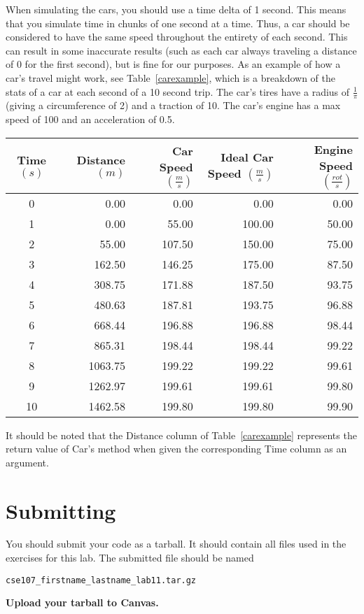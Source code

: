 \documentclass[11pt]{cselabheader}
\begin{document}
\begin{ex}
  When simulating the cars, you should use a time delta of 1 second. This means
  that you simulate time in chunks of one second at a time. Thus, a car should
  be considered to have the same speed throughout the entirety of each second.
  This can result in some inaccurate results (such as each car always
  traveling a distance of 0 for the first second), but is fine for our
  purposes. As an example of how a car's travel might work, see
  Table~\ref{carexample}, which is a breakdown of the stats of a car at each
  second of a 10 second trip. The car's tires have a radius of $\frac{1}{\pi}$
  (giving a circumference of 2) and a traction of 10. The car's engine has a
  max speed of 100 and an acceleration of 0.5.
  
  \begin{center}
    \begin{tabular}{crrrr}
    \toprule
    Time $(s)$ & Distance $(m)$ & Car Speed $(\frac{m}{s})$ &
    Ideal Car Speed $(\frac{m}{s})$ & Engine Speed $(\frac{rot}{s})$\\
    \midrule
    0  &    0.00 &   0.00 &   0.00 &  0.00\\
    1  &    0.00 &  55.00 & 100.00 & 50.00\\
    2  &   55.00 & 107.50 & 150.00 & 75.00\\
    3  &  162.50 & 146.25 & 175.00 & 87.50\\
    4  &  308.75 & 171.88 & 187.50 & 93.75\\
    5  &  480.63 & 187.81 & 193.75 & 96.88\\
    6  &  668.44 & 196.88 & 196.88 & 98.44\\
    7  &  865.31 & 198.44 & 198.44 & 99.22\\
    8  & 1063.75 & 199.22 & 199.22 & 99.61\\
    9  & 1262.97 & 199.61 & 199.61 & 99.80\\
    10 & 1462.58 & 199.80 & 199.80 & 99.90\\
    \bottomrule
    \end{tabular}
    \label{carexample}
  \end{center}
  
  It should be noted that the Distance column of Table~\ref{carexample}
  represents the return value of Car's
   method when given the
  corresponding Time column as an argument.
\end{ex}

\pagebreak
\section{Submitting}
You should submit your code as a tarball. It should contain all files
used in the exercises for this lab. The submitted file should be named
\begin{center}
  \texttt{cse107\_firstname\_lastname\_lab11.tar.gz}
\end{center}

\begin{center}
  \textbf{Upload your tarball to Canvas.}
\end{center}

\listoftheorems
\end{document}
